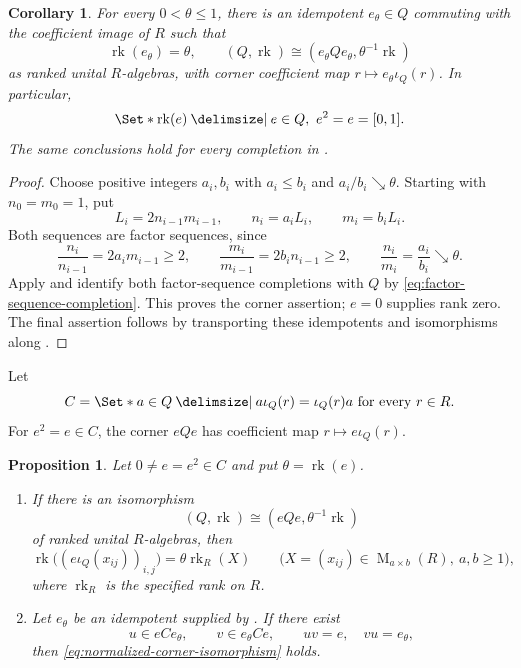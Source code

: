 \documentclass[11pt]{amsart}
\providecommand\given{}
\newcommand\SetSymbol[1][]{%
  \nonscript\:#1\vert\allowbreak\nonscript\:\mathopen{}%
}
\renewcommand\given{\SetSymbol[\delimsize]}#1%
\DeclareMathOperator{\rk}{rk}
\DeclareMathOperator{\Mat}{M}
\newtheorem{proposition}[theorem]{Proposition}
\newtheorem{corollary}[theorem]{Corollary}
\theoremstyle{definition}
\theoremstyle{remark}
\begin{document}
\begin{corollary}\label{cor:prescribed-rank-corners}
For every $0<\theta\leq1$, there is an
idempotent $e_\theta\in Q$ commuting with the coefficient image of $R$
such that
\[
 \rk(e_\theta)=\theta,\qquad
 (Q,\rk)\cong(e_\theta Qe_\theta,\theta^{-1}\rk)
\]
as ranked unital $R$-algebras, with corner coefficient map
$r\mapsto e_\theta\iota_Q(r)$.  In particular,
\[
 \Set*{\rk(e) \given e\in Q,\ e^2=e}=[0,1].
\]
The same conclusions hold for every completion in .
\end{corollary}

\begin{proof}
Choose positive integers $a_i,b_i$ with $a_i\leq b_i$ and
$a_i/b_i\searrow\theta$.  Starting with $n_0=m_0=1$, put
\[
 L_i=2n_{i-1}m_{i-1},\qquad n_i=a_iL_i,\qquad m_i=b_iL_i.
\]
Both sequences are factor sequences, since
\[
 \frac{n_i}{n_{i-1}}=2a_im_{i-1}\geq2,\qquad
 \frac{m_i}{m_{i-1}}=2b_in_{i-1}\geq2,
 \qquad \frac{n_i}{m_i}=\frac{a_i}{b_i}\searrow\theta.
\]
Apply  and identify both factor-sequence
completions with $Q$ by \eqref{eq:factor-sequence-completion}.  This proves the corner assertion;
$e=0$ supplies rank zero.  The final assertion follows by transporting
these idempotents and isomorphisms along .
\end{proof}

Let
\[
 C=\Set*{a\in Q\given
 a\iota_Q(r)=\iota_Q(r)a\text{ for every }r\in R}.
\]
For $e^2=e\in C$, the corner $eQe$ has coefficient map
$r\mapsto e\iota_Q(r)$.

\begin{proposition}\label{prop:corner-isomorphism-criteria}
Let $0\ne e=e^2\in C$ and put $\theta=\rk(e)$.
\begin{enumerate}[label=(\alph*), ref=\alph*]
\item\label{item:corner-necessary}
If there is an isomorphism
\begin{equation}\label{eq:normalized-corner-isomorphism}
 (Q,\rk)\cong(eQe,\theta^{-1}\rk)
\end{equation}
of ranked unital $R$-algebras, then
\begin{equation}\label{eq:corner-coefficient-ranks}
 \rk\bigl((e\iota_Q(x_{ij}))_{i,j}\bigr)
 =\theta\rk_R(X)
 \qquad\bigl(X=(x_{ij})\in\Mat_{a\times b}(R),\ a,b\geq1\bigr),
\end{equation}
where $\rk_R$ is the specified rank on $R$.
\item\label{item:corner-sufficient}
Let $e_\theta$ be an idempotent supplied by
.
If there exist
\[
 u\in eCe_\theta,\qquad v\in e_\theta Ce,
 \qquad uv=e,\quad vu=e_\theta,
\]
then \eqref{eq:normalized-corner-isomorphism} holds.
\end{enumerate}
\end{proposition}
\end{document}
